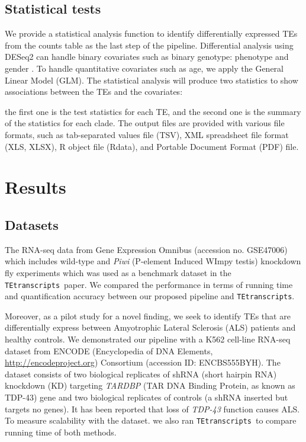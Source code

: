 \documentclass[wsdraft]{ws-procs11x85}
\newcommand{\TEtranscripts}{\texttt{TEtranscripts}}
\begin{document}
\subsection{Statistical tests}
We provide a statistical analysis function to identify differentially expressed TEs from the counts table as the last step of the pipeline. 
Differential analysis using DESeq2 can handle  binary covariates such as binary genotype: phenotype and gender \cite{love2014moderated}. To handle quantitative covariates such as age, we apply the General Linear Model (GLM)\cite{johnston1980multivariate}. The statistical analysis will produce two statistics to show associations between the TEs and the covariates:

the first one is the test statistics for each TE, and the second one is the summary of the statistics for each clade. 
The output files are provided with various file formats, such as tab-separated values file (TSV), XML spreadsheet file format (XLS, XLSX), R object file (Rdata), and Portable Document Format (PDF) file.

\section{Results}

\subsection{Datasets}

The RNA-seq data from Gene Expression Omnibus (accession no. GSE47006)
which includes wild-type and \textit{Piwi} (P-element Induced WImpy testis) knockdown fly experiments
which was used as a benchmark dataset in the \TEtranscripts~paper.\cite{ohtani2013dmgtsf1} We compared the performance in terms of running time and quantification accuracy between our proposed pipeline and \TEtranscripts.

Moreover, as a pilot study for a novel finding, we seek to identify TEs that are  differentially express between Amyotrophic Lateral Sclerosis (ALS) patients and healthy  controls.
We demonstrated our pipeline with a K562 cell-line RNA-seq dataset from ENCODE (Encyclopedia of DNA Elements, \url{http://encodeproject.org})  Consortium (accession ID: ENCBS555BYH).\cite{encode2012integrated}
The dataset consists of two biological replicates of shRNA (short hairpin RNA) knockdown (KD) targeting \textit{TARDBP} (TAR DNA Binding Protein, as known as TDP-43) gene and two biological replicates of controls (a shRNA inserted but targets no genes). 
It has been reported that loss of \textit{TDP-43} function causes  ALS.\cite{yang2014partial,mihevc2016tdp} To measure scalability with the dataset. we also ran \TEtranscripts~to compare running time of both methods.
\end{document}
